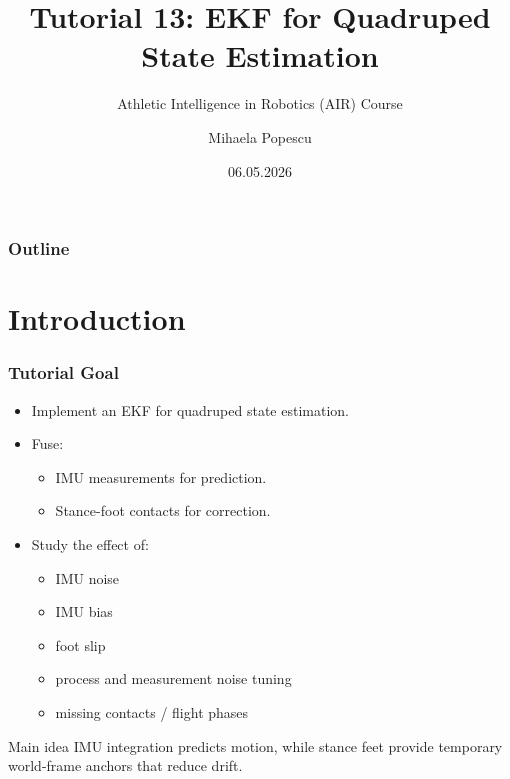 \documentclass[aspectratio=169]{beamer}
\title{Tutorial 13: EKF for Quadruped State Estimation}
\subtitle{Athletic Intelligence in Robotics (AIR) Course}
\author{Mihaela Popescu}
\date{06.05.2026}
\begin{document}
\begin{frame}
	\titlepage
\end{frame}

\begin{frame}
	\frametitle{Outline}
	\tableofcontents
\end{frame}

\section{Introduction}
\begin{frame}
	\frametitle{Tutorial Goal}
	
	\begin{itemize}
		\item Implement an EKF for quadruped state estimation.
		\item Fuse:
		\begin{itemize}
			\item IMU measurements for prediction.
			\item Stance-foot contacts for correction.
		\end{itemize}
		\item Study the effect of:
		\begin{itemize}
			\item IMU noise
			\item IMU bias
			\item foot slip
			\item process and measurement noise tuning
			\item missing contacts / flight phases
		\end{itemize}
	\end{itemize}
	
	\begin{block}{Main idea}
		IMU integration predicts motion, while stance feet provide temporary world-frame anchors that reduce drift.
	\end{block}
	
\end{frame}
\end{document}
